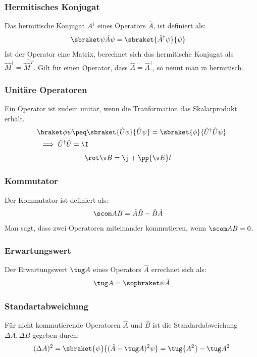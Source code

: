 \documentclass[twocolumn, unnumberedsubsub]{summery_5.0} %
\begin{document}
\subsubsection{Hermitisches Konjugat}
Das hermitische Konjugat \(A^\dagger\) eines Operators \(\hat A\), ist definiert als:
\begin{align*}
    \sbraket\psi{\hat A\psi} &= \sbraket{\hat A^\dagger\psi}{\psi}
\end{align*}
Ist der Operator eine Matrix, berechnet sich das hermitische Konjugat als \(\hat M^\dagger = \overline{\hat M ^T}\).
Gilt für einen Operator, dass \(\hat A = \hat A^\dagger\), so nennt man in hermitisch.  

\subsubsection{Unitäre Operatoren}
Ein Operator ist zudem unitär, wenn die Tranformation das Skalarprodukt erhält.
\begin{align*}
    \braket\phi\psi &\peq \sbraket{\hat U \phi}{ \hat U \psi}
    = \sbraket{\phi}{\hat U^\dagger \hat U \psi}\\
    \implies \hat U^\dagger \hat U &= \I
\end{align*}
\begin{align*}
    \rot \v B &= \j + \pp{\v E}t
\end{align*}
\subsubsection{Kommutator}
Der Kommutator ist definiert als:
\begin{align*}
    \scom AB &= \hat A \hat B - \hat B \hat A
\end{align*}
Man sagt, dass zwei Operatoren miteinander kommutieren, wenn \(\scom AB = 0\).  


\subsubsection{Erwartungswert}
Der Erwartungswert \(\tug A\) eines Operators \(\hat A\) errechnet sich als:
\begin{align*}
    \tug A = \sopbraket\psi {\hat A}
\end{align*}

\subsubsection{Standartabweichung}
Für nicht kommutierende Operatoren \(\hat A\) und \(\hat B\) ist die Standardabweichung \(\Delta A,\Delta B\)
gegeben durch:
\begin{align*}
    (\Delta A)^2 &= \sbraket{\psi}{(\hat A - \tug A)^2\psi}
    = \tug {A^2}- \tug A^2\\
\end{align*}
\end{document}
